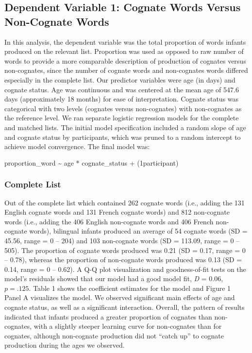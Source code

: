 \documentclass[
  ,man,floatsintext]{apa6}
\begin{document}
\hypertarget{dependent-variable-1-cognate-words-versus-non-cognate-words}{%
\subsection{Dependent Variable 1: Cognate Words Versus Non-Cognate Words}\label{dependent-variable-1-cognate-words-versus-non-cognate-words}}

In this analysis, the dependent variable was the total proportion of words infants produced on the relevant list. Proportion was used as opposed to raw number of words to provide a more comparable description of production of cognates versus non-cognates, since the number of cognate words and non-cognates words differed especially in the complete list. Our predictor variables were age (in days) and cognate status. Age was continuous and was centered at the mean age of 547.6 days (approximately 18 months) for ease of interpretation. Cognate status was categorical with two levels (cognates versus non-cognates) with non-cognates as the reference level. We ran separate logistic regression models for the complete and matched lists. The initial model specification included a random slope of age and cognate status by participants, which was pruned to a random intercept to achieve model convergence. The final model was:

proportion\_word \textasciitilde{} age * cognate\_status + (1\textbar participant)

\hypertarget{complete-list}{%
\subsubsection{Complete List}\label{complete-list}}

Out of the complete list which contained 262 cognate words (i.e., adding the 131 English cognate words and 131 French cognate words) and 812 non-cognate words (i.e., adding the 406 English non-cognate words and 406 French non-cognate words), bilingual infants produced an average of 54 cognate words (SD = 45.56, range = 0 -- 204) and 103 non-cognate words (SD = 113.09, range = 0 -- 505). The proportion of cognate words produced was 0.21 (SD = 0.17, range = 0 -- 0.78), whereas the proportion of non-cognate words produced was 0.13 (SD = 0.14, range = 0 -- 0.62). A Q-Q plot visualization and goodness-of-fit tests on the model's residuals showed that our model had a good model fit, \emph{D} = 0.06, \(p = .125\). Table 1 shows the coefficient estimates for the model and Figure 1 Panel A visualizes the model. We observed significant main effects of age and cognate status, as well as a significant interaction. Overall, the pattern of results indicated that infants produced a greater proportion of cognates than non-cognates, with a slightly steeper learning curve for non-cognates than for cognates, although non-cognate production did not ``catch up'' to cognate production during the ages we observed.
\end{document}
